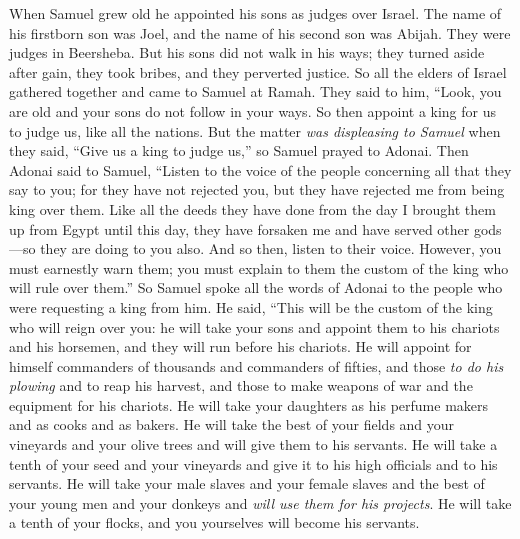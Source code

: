 \begin{biblechapter} %
 When Samuel grew old he appointed his sons as judges over Israel.
\verse The name of his firstborn son was Joel, and the name of his second son was Abijah. They were judges in Beersheba.
\verse But his sons did not walk in his ways; they turned aside after gain, they took bribes, and they perverted justice.
\verse So all the elders of Israel gathered together and came to Samuel at Ramah.
\verse They said to him, “Look, you are old and your sons do not follow in your ways. So then appoint a king for us to judge us, like all the nations.
\verse But the matter \textit{was displeasing to Samuel} when they said, “Give us a king to judge us,” so Samuel prayed to Adonai.
\verse Then Adonai said to Samuel, “Listen to the voice of the people concerning all that they say to you; for they have not rejected you, but they have rejected me from being king over them.
\verse Like all the deeds they have done from the day I brought them up from Egypt until this day, they have forsaken me and have served other gods—so they are doing to you also.
\verse And so then, listen to their voice. However, you must earnestly warn them; you must explain to them the custom of the king who will rule over them.”
\verse So Samuel spoke all the words of Adonai to the people who were requesting a king from him.
\verse He said, “This will be the custom of the king who will reign over you: he will take your sons and appoint them to his chariots and his horsemen, and they will run before his chariots.
\verse He will appoint for himself commanders of thousands and commanders of fifties, and those \textit{to do his plowing} and to reap his harvest, and those to make weapons of war and the equipment for his chariots.
\verse He will take your daughters as his perfume makers and as cooks and as bakers.
\verse He will take the best of your fields and your vineyards and your olive trees and will give them to his servants.
\verse He will take a tenth of your seed and your vineyards and give it to his high officials and to his servants.
\verse He will take your male slaves and your female slaves and the best of your young men and your donkeys and \textit{will use them for his projects}.
\verse He will take a tenth of your flocks, and you yourselves will become his servants.

\end{biblechapter}

